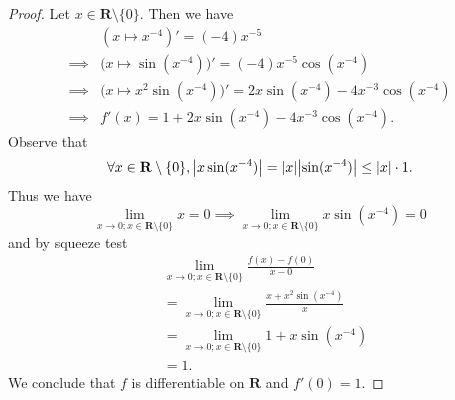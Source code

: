 \begin{proof}
    Let \(x \in \mathbf{R} \setminus \{0\}\).
    Then we have
    \begin{align*}
                 & (x \mapsto x^{-4})' = (-4) x^{-5}                                               \\
        \implies & \big(x \mapsto \sin(x^{-4})\big)' = (-4) x^{-5} \cos(x^{-4})                    \\
        \implies & \big(x \mapsto x^2 \sin(x^{-4})\big)' = 2x \sin(x^{-4}) - 4 x^{-3} \cos(x^{-4}) \\
        \implies & f'(x) = 1 + 2 x \sin(x^{-4}) - 4 x^{-3} \cos(x^{-4}).
    \end{align*}
    Observe that
    \[
        \forall x \in \mathbf{R} \setminus \{0\}, \abs*{x \sin(x^{-4})} = \abs*{x} \abs*{\sin(x^{-4})} \leq \abs*{x} \cdot 1.
    \]
    Thus we have
    \[
        \lim_{x \to 0 ; x \in \mathbf{R} \setminus \{0\}} x = 0 \implies \lim_{x \to 0 ; x \in \mathbf{R} \setminus \{0\}} x \sin(x^{-4}) = 0
    \]
    and by squeeze test
    \begin{align*}
         & \lim_{x \to 0 ; x \in \mathbf{R} \setminus \{0\}} \frac{f(x) - f(0)}{x - 0}        \\
         & = \lim_{x \to 0 ; x \in \mathbf{R} \setminus \{0\}} \frac{x + x^2 \sin(x^{-4})}{x} \\
         & = \lim_{x \to 0 ; x \in \mathbf{R} \setminus \{0\}} 1 + x \sin(x^{-4})             \\
         & = 1.
    \end{align*}
    We conclude that \(f\) is differentiable on \(\mathbf{R}\) and \(f'(0) = 1\).


\end{proof}
